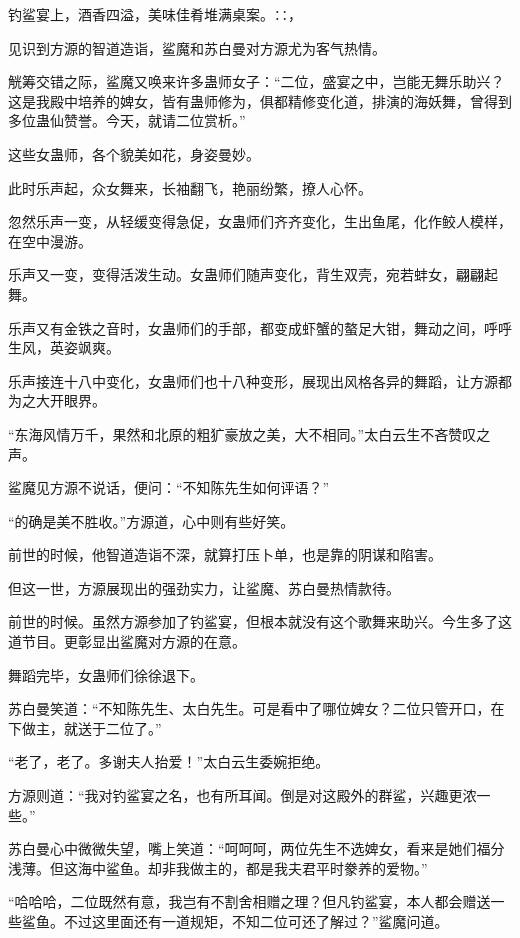 
\begin{this_body}

钓鲨宴上，酒香四溢，美味佳肴堆满桌案。∷，

见识到方源的智道造诣，鲨魔和苏白曼对方源尤为客气热情。

觥筹交错之际，鲨魔又唤来许多蛊师女子：“二位，盛宴之中，岂能无舞乐助兴？这是我殿中培养的婢女，皆有蛊师修为，俱都精修变化道，排演的海妖舞，曾得到多位蛊仙赞誉。今天，就请二位赏析。”

这些女蛊师，各个貌美如花，身姿曼妙。

此时乐声起，众女舞来，长袖翻飞，艳丽纷繁，撩人心怀。

忽然乐声一变，从轻缓变得急促，女蛊师们齐齐变化，生出鱼尾，化作鲛人模样，在空中漫游。

乐声又一变，变得活泼生动。女蛊师们随声变化，背生双壳，宛若蚌女，翩翩起舞。

乐声又有金铁之音时，女蛊师们的手部，都变成虾蟹的螯足大钳，舞动之间，呼呼生风，英姿飒爽。

乐声接连十八中变化，女蛊师们也十八种变形，展现出风格各异的舞蹈，让方源都为之大开眼界。

“东海风情万千，果然和北原的粗犷豪放之美，大不相同。”太白云生不吝赞叹之声。

鲨魔见方源不说话，便问：“不知陈先生如何评语？”

“的确是美不胜收。”方源道，心中则有些好笑。

前世的时候，他智道造诣不深，就算打压卜单，也是靠的阴谋和陷害。

但这一世，方源展现出的强劲实力，让鲨魔、苏白曼热情款待。

前世的时候。虽然方源参加了钓鲨宴，但根本就没有这个歌舞来助兴。今生多了这道节目。更彰显出鲨魔对方源的在意。

舞蹈完毕，女蛊师们徐徐退下。

苏白曼笑道：“不知陈先生、太白先生。可是看中了哪位婢女？二位只管开口，在下做主，就送于二位了。”

“老了，老了。多谢夫人抬爱！”太白云生委婉拒绝。

方源则道：“我对钓鲨宴之名，也有所耳闻。倒是对这殿外的群鲨，兴趣更浓一些。”

苏白曼心中微微失望，嘴上笑道：“呵呵呵，两位先生不选婢女，看来是她们福分浅薄。但这海中鲨鱼。却非我做主的，都是我夫君平时豢养的爱物。”

“哈哈哈，二位既然有意，我岂有不割舍相赠之理？但凡钓鲨宴，本人都会赠送一些鲨鱼。不过这里面还有一道规矩，不知二位可还了解过？”鲨魔问道。


\end{this_body}
